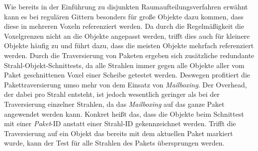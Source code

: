 Wie bereits in der Einführung zu disjunkten Raumaufteilungsverfahren erwähnt kann es bei regulären Gittern besonders für große Objekte dazu kommen, dass diese in mehreren Voxeln referenziert werden. Da durch die Regelmäßigkeit die Voxelgrenzen nicht an die Objekte angepasst werden, trifft dies auch für kleinere Objekte häufig zu und führt dazu, dass die meisten Objekte mehrfach referenziert werden. Durch die Traversierung von Paketen ergeben sich zusätzliche redundante Strahl-Objekt-Schnittests, da alle Strahlen immer gegen alle Objekte aller vom Paket geschnittenen Voxel einer Scheibe getestet werden. Deswegen profitiert die Pakettraversierung umso mehr von dem Einsatz von \textit{Mailboxing}. Der Overhead, der dabei pro Strahl entsteht, ist jedoch wesentlich geringer als bei der Traversierung einzelner Strahlen, da das \textit{Mailboxing} auf das ganze Paket angewendet werden kann. Konkret heißt das, dass die Objekte beim Schnittest mit einer \textit{Paket}-ID anstatt einer Strahl-ID gekennzeichnet werden. Trifft die Traversierung auf ein Objekt das bereits mit dem aktuellen Paket markiert wurde, kann der Test für alle Strahlen des Pakets übersprungen werden.\citep{WIKKP06}

